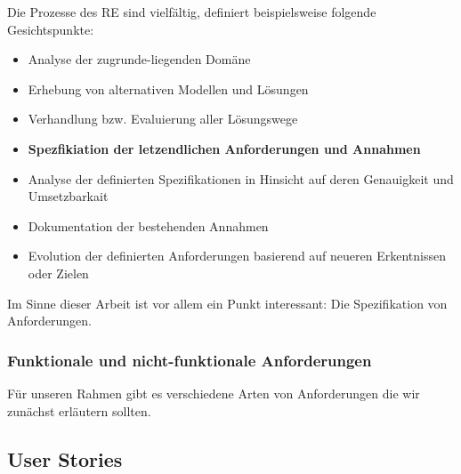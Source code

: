 
Die Prozesse des RE sind vielfältig, \cite{vanlamsweerdeRequirementsEngineeringYear2000} definiert beispielsweise folgende Gesichtspunkte:

\begin{itemize}
    \item Analyse der zugrunde-liegenden Domäne
    \item Erhebung von alternativen Modellen und Lösungen
    \item Verhandlung bzw. Evaluierung aller Lösungswege
    \item \textbf{Spezfikiation der letzendlichen Anforderungen und Annahmen}
    \item Analyse der definierten Spezifikationen in Hinsicht auf deren Genauigkeit und Umsetzbarkait
    \item Dokumentation der bestehenden Annahmen
    \item Evolution der definierten Anforderungen basierend auf neueren Erkentnissen oder Zielen
\end{itemize}

Im Sinne dieser Arbeit ist vor allem ein Punkt interessant: Die Spezifikation von Anforderungen.

\subsubsection{Funktionale und nicht-funktionale Anforderungen}\label{ch:Funktionale und nicht-funktionale Anforderungen}

Für unseren Rahmen gibt es verschiedene Arten von Anforderungen die wir zunächst erläutern sollten. 


\subsection{User Stories}\label{ch:User Stories}



